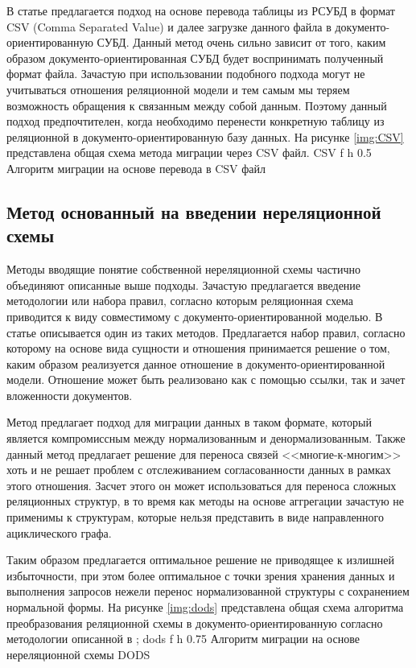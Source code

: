 \clearpage
В статье \cite{csv} предлагается подход на основе перевода таблицы из РСУБД в формат CSV (Comma Separated Value) и далее загрузке данного файла в документо-ориентированную СУБД.
Данный метод очень сильно зависит от того, каким образом документо-ориентированная СУБД будет воспринимать полученный формат файла.
Зачастую при использовании подобного подхода могут не учитываться отношения реляционной модели и тем самым мы теряем возможность обращения к связанным между собой данным.
Поэтому данный подход предпочтителен, когда необходимо перенести конкретную таблицу из реляционной в документо-ориентированную базу данных.
На рисунке \ref{img:CSV} представлена общая схема метода миграции через CSV файл.
    {CSV} %
    {f} %
    {h} %
    {0.5\textwidth} %
    {Алгоритм миграции на основе перевода в CSV файл} %

\clearpage

\subsection{Метод основанный на введении нереляционной схемы}
Методы вводящие понятие собственной нереляционной схемы частично объединяют описанные выше подходы.
Зачастую предлагается введение методологии или набора правил,
согласно которым реляционная схема приводится к виду совместимому с документо-ориентированной моделью.
В статье \cite{DODS} описывается один из таких методов.
Предлагается набор правил, согласно которому на основе вида сущности и отношения принимается решение о том, каким образом реализуется данное отношение в документо-ориентированной модели.
Отношение может быть реализовано как с помощью ссылки, так и зачет вложенности документов.



Метод предлагает подход для миграции данных в таком формате, который является компромиссным между нормализованным и денормализованным.
Также данный метод предлагает решение для переноса связей <<многие-к-многим>> хоть и не решает проблем с отслеживанием согласованности данных в рамках этого отношения. 
Засчет этого он может использоваться для переноса сложных реляционных структур, в то время как методы на основе аггрегации зачастую не применимы к структурам,
которые нельзя представить в виде направленного ациклического графа. 

Таким образом предлагается оптимальное решение не приводящее к излишней избыточности,
при этом более оптимальное с точки зрения хранения данных и выполнения запросов нежели перенос нормализованной структуры с сохранением нормальной формы.
\clearpage
На рисунке \ref{img:dods} представлена общая схема алгоритма преобразования реляционной схемы в документо-ориентированную согласно методологии описанной в \cite{DODS};
    {dods} %
    {f} %
    {h} %
    {0.75\textwidth} %
    {Алгоритм миграции на основе нереляционной схемы DODS} %

